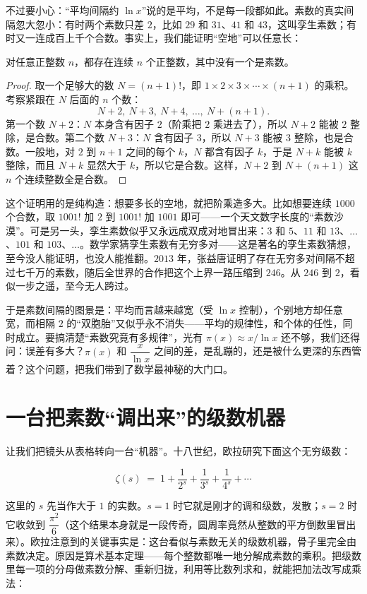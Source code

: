 不过要小心：“平均间隔约 $\ln x$”说的是平均，不是每一段都如此。素数的真实间隔忽大忽小：有时两个素数只差 $2$，比如 $29$ 和 $31$、$41$ 和 $43$，这叫孪生素数；有时又一连成百上千个合数。事实上，我们能证明“空地”可以任意长：

\begin{dingli}[素数间隔可以任意大]
对任意正整数 $n$，都存在连续 $n$ 个正整数，其中没有一个是素数。
\end{dingli}

\begin{proof}
取一个足够大的数 $N=(n+1)!$，即 $1\times2\times3\times\cdots\times(n+1)$ 的乘积。考察紧跟在 $N$ 后面的 $n$ 个数：
\[
N+2,\ N+3,\ N+4,\ \dots,\ N+(n+1).
\]
第一个数 $N+2$：$N$ 本身含有因子 $2$（阶乘把 $2$ 乘进去了），所以 $N+2$ 能被 $2$ 整除，是合数。第二个数 $N+3$：$N$ 含有因子 $3$，所以 $N+3$ 能被 $3$ 整除，也是合数。一般地，对 $2$ 到 $n+1$ 之间的每个 $k$，$N$ 都含有因子 $k$，于是 $N+k$ 能被 $k$ 整除，而且 $N+k$ 显然大于 $k$，所以它是合数。这样，$N+2$ 到 $N+(n+1)$ 这 $n$ 个连续整数全是合数。
\end{proof}

这个证明用的是纯构造：想要多长的空地，就把阶乘造多大。比如想要连续 $1000$ 个合数，取 $1001!$ 加 $2$ 到 $1001!$ 加 $1001$ 即可——一个天文数字长度的“素数沙漠”。可是另一头，孪生素数似乎又永远成双成对地冒出来：$3$ 和 $5$、$11$ 和 $13$、$\dots$、$101$ 和 $103$、$\dots$。数学家猜孪生素数有无穷多对——这是著名的孪生素数猜想，至今没人能证明，也没人能推翻。$2013$ 年，张益唐证明了存在无穷多对间隔不超过七千万的素数，随后全世界的合作把这个上界一路压缩到 $246$。从 $246$ 到 $2$，看似一步之遥，至今无人跨过。

于是素数间隔的图景是：平均而言越来越宽（受 $\ln x$ 控制），个别地方却任意宽，而相隔 $2$ 的“双胞胎”又似乎永不消失——平均的规律性，和个体的任性，同时成立。要搞清楚“素数究竟有多规律”，光有 $\pi(x)\approx x/\ln x$ 还不够，我们还得问：误差有多大？$\pi(x)$ 和 $\dfrac{x}{\ln x}$ 之间的差，是乱蹦的，还是被什么更深的东西管着？这个问题，把我们带到了数学最神秘的大门口。

\section{一台把素数“调出来”的级数机器}

让我们把镜头从表格转向一台“机器”。十八世纪，欧拉研究下面这个无穷级数：

\[
\zeta(s)\;=\;1+\frac{1}{2^{s}}+\frac{1}{3^{s}}+\frac{1}{4^{s}}+\cdots
\]

这里的 $s$ 先当作大于 $1$ 的实数。$s=1$ 时它就是刚才的调和级数，发散；$s=2$ 时它收敛到 $\dfrac{\pi^{2}}{6}$（这个结果本身就是一段传奇，圆周率竟然从整数的平方倒数里冒出来）。欧拉注意到的关键事实是：这台看似与素数无关的级数机器，骨子里完全由素数决定。原因是算术基本定理——每个整数都唯一地分解成素数的乘积。把级数里每一项的分母做素数分解、重新归拢，利用等比数列求和，就能把加法改写成乘法：

